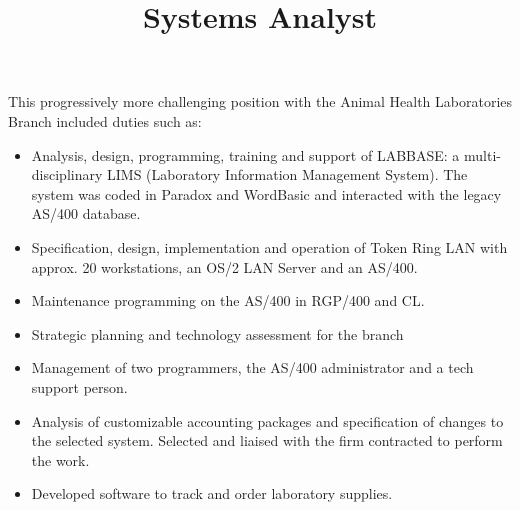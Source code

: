 \begin{resume}
\begin{position}
\begin{itemize}
\end{itemize}

\end{position}



\title{Systems Analyst}
\begin{position}
This progressively more challenging position with the Animal Health
Laboratories Branch included duties such as:
\begin{itemize}
\item Analysis, design, programming, training and support of LABBASE: 
        a multi-disciplinary LIMS (Laboratory Information Management System).  
	The system was coded in Paradox and WordBasic and
	interacted with the legacy AS/400 database.
\item Specification, design, implementation and operation of Token Ring LAN 
	with approx. 20 workstations, an OS/2 LAN Server and an AS/400.  
\item Maintenance programming on the AS/400 in RGP/400 and CL.  
\item Strategic planning and technology assessment for the branch 
\item Management of two programmers, the AS/400 administrator and a
	 tech support person.
\item Analysis of customizable accounting packages and specification 
	of changes to the selected system. Selected and liaised with 
	the firm contracted to perform the work.
\item Developed software to track and order laboratory supplies.
\end{itemize}
\end{position}



\end{resume}
